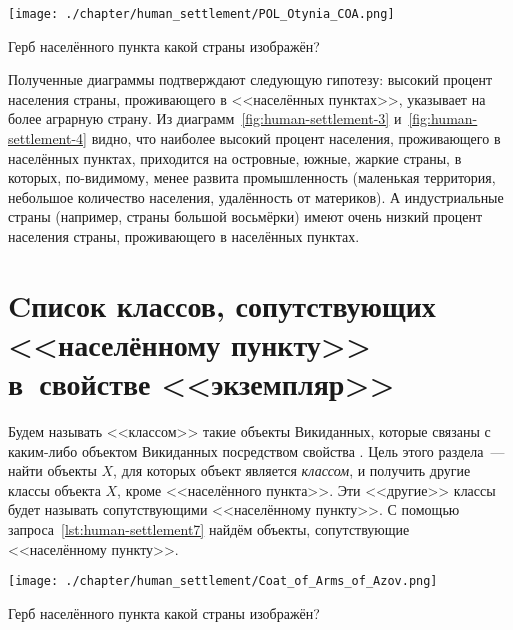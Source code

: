 \begin{marginfigure}[0.0cm]
{\texttt{[image: ./chapter/human\_settlement/POL\_Otynia\_COA.png]}}
  \caption{Герб населённого пункта какой страны изображён?}%
  \label{fig:flag_question_human_settlements4}%
\end{marginfigure}

Полученные диаграммы подтверждают следующую гипотезу: 
высокий процент населения страны, проживающего в <<населённых пунктах>>, 
указывает на более аграрную страну. 
Из диаграмм~\ref{fig:human-settlement-3} и~\ref{fig:human-settlement-4} видно, 
что наиболее высокий процент населения, проживающего в населённых пунктах, 
приходится на островные, южные, жаркие страны, 
в которых, по-видимому, менее развита промышленность 
(маленькая территория, небольшое количество населения, удалённость от материков). 
А индустриальные страны (например, страны большой восьмёрки) имеют очень низкий процент населения страны, 
проживающего в населённых пунктах.



\section{Cписок классов, сопутствующих <<населённому пункту>> в~свойстве <<экземпляр>>}
\label{human-settlement:tag1}

Будем называть <<классом>> такие объекты Викиданных, 
которые связаны с каким-либо объектом Викиданных посредством свойства . 
Цель этого раздела~--- найти объекты $X$, 
для которых объект  является \emph{классом}, 
и получить другие классы объекта $X$, кроме <<населённого пункта>>. 
Эти <<другие>> классы будет называть сопутствующими <<населённому пункту>>. 
С помощью запроса~\ref{lst:human-settlement7} 
найдём объекты, сопутствующие <<населённому пункту>>. 


\begin{marginfigure}[-1.0cm]
{\texttt{[image: ./chapter/human\_settlement/Coat\_of\_Arms\_of\_Azov.png]}}
  \caption{Герб населённого пункта какой страны изображён?}%
  \label{fig:flag_question_human_settlements5}%
\end{marginfigure}

